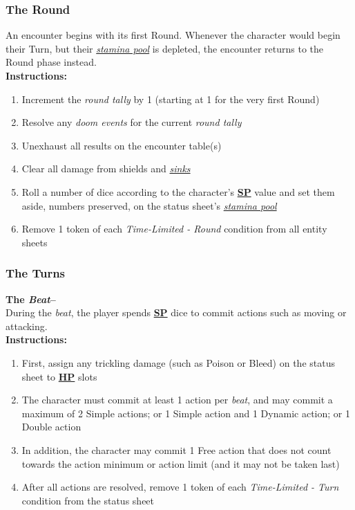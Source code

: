 \documentclass[12pt]{article}
\newcommand{\refto}[1]{\hyperlink{#1}{\textbf{#1}}}
\newcommand{\reftoit}[1]{\hyperlink{#1}{\emph{#1}}}
\begin{document}
\begin{multicols*}{2}
\subsubsection{The Round}
An encounter begins with its first Round. Whenever the character would begin their Turn, but their \reftoit{stamina pool} is depleted, the encounter returns to the Round phase instead.\\
\textbf{Instructions:}
\begin{enumerate}
\item Increment the \emph{round tally} by 1 (starting at 1 for the very first Round)
\item Resolve any \emph{doom events} for the current \emph{round tally}
\item Unexhaust all results on the encounter table(s)
\item Clear all damage from shields and \reftoit{sinks}
\item Roll a number of dice according to the character’s \refto{SP} value and set them aside, numbers preserved, on the status sheet’s \reftoit{stamina pool}
\item Remove 1 token of each \emph{Time-Limited - Round} condition from all entity sheets
\end{enumerate}

\subsubsection{The Turns}
\textbf{The \emph{Beat}--}\\
During the \emph{beat}, the player spends \refto{SP} dice to commit actions such as moving or attacking.\\
\textbf{Instructions:}
\begin{enumerate}
\item First, assign any trickling damage (such as Poison or Bleed) on the status sheet to \refto{HP} slots
\item The character must commit at least 1 action per \emph{beat}, and may commit a maximum of 2 Simple actions; or 1 Simple action and 1 Dynamic action; or 1 Double action
\item In addition, the character may commit 1 Free action that does not count towards the action minimum or action limit (and it may not be taken last)
\item After all actions are resolved, remove 1 token of each \emph{Time-Limited - Turn} condition from the status sheet
\end{enumerate}


\end{multicols*}
\end{document}
